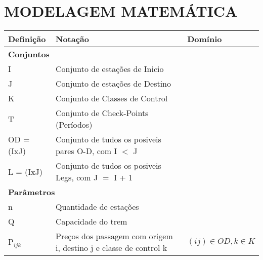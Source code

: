 \documentclass[10pt,a4paper]{article}
\begin{document}
\section{MODELAGEM MATEMÁTICA}

\begin{table}[H]
	\centering
	\small
	\begin{tabular}{@{}lll@{}}
		\toprule
		\textbf{Definição} & \textbf{Notação}                                                                     & \textbf{Domínio}                  \\ \midrule
		\multicolumn{3}{l}{\textbf{Conjuntos}}                                                                                                        \\ \midrule
		I                  & Conjunto de estações de Inicio                                                       &                                   \\
		J                  & Conjunto de estações de Destino                                                      &                                   \\
		K                  & Conjunto de Classes de Control                                                       &                                   \\
		T                  & Conjunto de Check-Points (Períodos)                                                  &                                   \\
		OD = (IxJ)         & Conjunto de tudos os posiveis pares O-D, com I $<$ J                                 &                                   \\
		L = (IxJ)          & Conjunto de tudos os posiveis Legs, com  J $=$ I + 1                                 &                                   \\ \midrule
		\multicolumn{3}{l}{\textbf{Parâmetros}}                                                                                                       \\ \midrule
		n                  & Quantidade de estações                                                               &                                   \\
		Q                  & Capacidade do trem                                                                   &                                   \\
		P$_{ijk}$          & Preços  dos passagem com origem i, destino j e classe de control k                   & $  (ij) \in OD, k \in K$          \\

\end{tabular}
\end{table}
\end{document}
